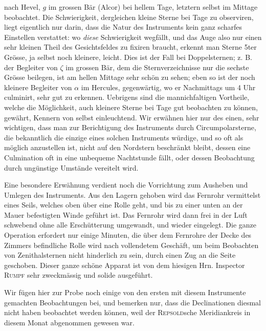 nach Hevel, $g$ im grossen Bär (Alcor) bei hellem Tage, letztern selbst im Mittage beobachtet. Die
Schwierigkeit, dergleichen kleine Sterne bei Tage zu observiren, liegt eigentlich nur darin, dass die
Natur des Instruments kein ganz scharfes Einstellen verstattet: wo \emph{diese} Schwierigkeit wegfällt,
und das Auge also nur einen sehr kleinen Theil des Gesichtsfeldes zu fixiren braucht, erkennt man
Sterne 5ter Grösse, ja selbst noch kleinere, leicht. Dies ist der Fall bei Doppelsternen; z. B. der
Begleiter von $\zeta$ im grossen Bär, dem die Sternverzeichnisse nur die sechste Grösse beilegen, ist
am hellen Mittage sehr schön zu sehen; eben so ist der noch kleinere Begleiter von $\alpha$ im
Hercules, gegenwärtig, wo er Nachmittags um 4 Uhr culminirt, sehr gut zu erkennen. Uebrigens sind die
mannichfaltigen Vortheile, welche die Möglichkeit, auch kleinere Sterne bei Tage gut beobachten zu
können, gewährt, Kennern von selbst einleuchtend. Wir erwähnen hier nur des einen, sehr wichtigen,
dass man zur Berichtigung des Instruments durch Circumpolarsterne, die bekanntlich die einzige eines
solchen Instruments würdige, und so oft als möglich anzustellen ist, nicht auf den Nordstern
beschränkt bleibt, dessen eine Culmination oft in eine unbequeme Nachtstunde fällt, oder dessen
Beobachtung durch ungünstige Umstände vereitelt wird.

\par\indent Eine besondere Erwähnung verdient noch die Vorrichtung zum Ausheben und Umlegen des Instruments.
Aus den Lagern gehoben wird das Fernrohr vermittelst eines Seils, welches oben über eine Rolle geht,
und bis zu einer unten an der Mauer befestigten Winde geführt ist. Das Fernrohr wird dann frei in der
Luft schwebend ohne alle Erschütterung umgewandt, und wieder eingelegt. Die ganze Operation erfordert
nur einige Minuten, die über dem Fernrohre der Decke des Zimmers befindliche Rolle wird nach
vollendetem Geschäft, um beim Beobachten von Zenithalsternen nicht hinderlich zu sein, durch einen
Zug an die Seite geschoben. 
Dieser ganze schöne Apparat ist von dem hiesigen Hrn. Inspector \textsc{Rumpf} sehr zweckmässig und
solide ausgeführt.

\par\indent Wir fügen hier zur Probe noch einige von den ersten mit diesem Instrumente gemachten Beobachtungen
bei, und bemerken nur, dass die Declinationen diesmal nicht haben beobachtet werden können, weil der
\textsc{Repsold}sche Meridiankreis in diesem Monat abgenommen gewesen war.

